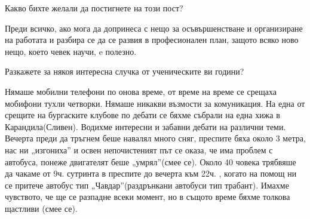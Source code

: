 \begin{multicols}{3}
Какво бихте желали да постигнете на този пост?

Преди всичко, ако мога да допринеса с нещо за осъвършенстване и организиране на 
работата и разбира се да се развия в професионален план, защото всяко ново нещо, 
което чевек научи, e полезно.

Разкажете за някоя интересна случка от ученическите ви години?

Нямаше мобилни телефони по онова време, от време на време се срещаха мобифони 
тухли четворки. Нямаше никакви възмости за комуникация. На една от срещите на 
бургаските клубове по дебати се бяхме събрали на една хижа в Карандила(Сливен). 
Водихме интересни и забавни дебати на различни теми. Вечерта преди да тръгнем 
беше навалял много сняг, преспите бяха около 3 метра, нас ни „изгониха” и освен 
непочистеният път се оказа, че има проблем с автобуса, понеже двигателят беше 
„умрял”(смее се). Около 40 човека трябвяше да чакаме от 9ч. сутринта  в преспите 
до вечерта към 22ч. , когато на помощ ни се притече автобус тип 
„Чавдар”(раздрънкани автобуси тип трабант). Имахме чувството, че ще се разпадне 
всеки момент, но в същото време бяхме толкова щастливи (смее се).

\closearticle
\end{multicols}